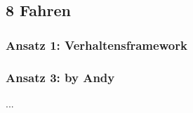 \subsection{8 Fahren}
\label{8-fahren}

\subsubsection{Ansatz 1: Verhaltensframework}

\subsubsection{Ansatz 3: by Andy}
...
